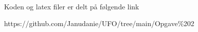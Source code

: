\documentclass{report}
\begin{document}






Koden og latex filer er delt på følgende link

https://github.com/Janudanie/UFO/tree/main/Opgave\%202
\end{document}
